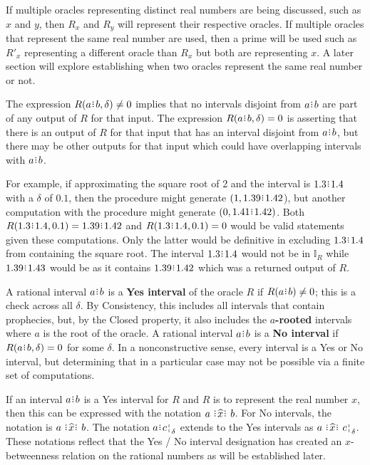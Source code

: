 \documentclass[12pt]{article}
\begin{document}
If multiple oracles representing distinct real numbers are being discussed, such as $x$ and $y$, then $R_x$ and $R_y$ will represent their respective oracles. If multiple oracles that represent the same real number are used, then a prime will be used such as $R'_x$ representing a different oracle than $R_x$ but both are representing $x$. A later section will explore establishing when two oracles represent the same real number or not. 

The expression $R(a\rint b, \delta) \neq 0$ implies that no intervals disjoint from $a\rint b$ are part of any output of $R$ for that input. The expression $R(a\rint b, \delta) = 0$ is asserting that there is an output of $R$ for that input that  has  an interval disjoint from $a \rint b$, but there may be other outputs for that input which could have overlapping intervals with $a \rint b$.

 For example, if approximating the square root of 2 and the interval is $1.3\rint 1.4$ with a $\delta$ of $0.1$, then the procedure might generate $(1, 1.39\rint 1.42$), but another computation with the procedure might generate $(0, 1.41\rint 1.42)$. Both $R(1.3\rint 1.4, 0.1) = 1.39\rint 1.42$ and $R(1.3\rint 1.4, 0.1) = 0$ would be valid statements given these computations. Only the latter would be definitive in excluding $1.3\rint 1.4$ from containing the square root. The interval $1.3\rint 1.4$ would not be in $\mathbb{I}_R$ while $1.39\rint 1.43$ would be as it contains $1.39\rint 1.42$ which was a returned output of $R$.

A rational interval $a\rint b$ is a \textbf{Yes interval} of the oracle $R$ if $R(a\rint b) \neq  0$; this is a check across all $\delta$. By Consistency, this includes all intervals that contain prophecies, but, by the Closed property, it also includes the \textbf{$a$-rooted} intervals where $a$ is the root of the oracle.   A rational interval $a\rint b$ is a \textbf{No interval} if $R(a\rint b, \delta) = 0$ for some $\delta$. In a nonconstructive sense, every interval is a Yes or No interval, but determining that in a particular case may not be possible via a finite set of computations. 

If an interval $a\rint b$ is a Yes interval for $R$ and $R$ is to represent the real number $x$, then this can be expressed with the notation $a \xora b$. For No intervals, the notation is \sout{$a \xora b$}. The notation $a\rint \fuzbright{c}$ extends to the Yes intervals as $a \xora \fuzbright{c}$. These notations reflect that the Yes / No interval designation has created an $x$-betweenness relation on the rational numbers as will be established later.
\end{document}
